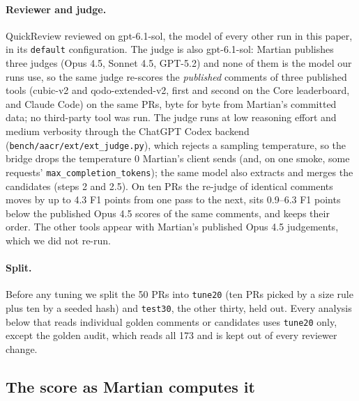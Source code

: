 \documentclass[11pt,a4paper]{article}
\newcommand{\qcr}{QuickReview}
\newcommand{\code}[1]{\texttt{#1}}
\begin{document}
\paragraph{Reviewer and judge.} \qcr{} reviewed on gpt-6.1-sol, the model of
every other run in this paper, in its \code{default} configuration. The
judge is also gpt-6.1-sol: Martian publishes three judges (Opus 4.5,
Sonnet 4.5, GPT-5.2) and none of them is the model our runs use, so the same
judge re-scores the \emph{published} comments of three published tools
(cubic-v2 and qodo-extended-v2, first and second on the Core leaderboard, and
Claude Code) on the same PRs, byte for byte from Martian's committed data; no
third-party tool was run. The judge runs at low reasoning effort and medium
verbosity through the ChatGPT Codex backend (\code{bench/aacr/ext/ext\_judge.py}),
which rejects a sampling temperature, so the bridge drops the temperature 0
Martian's client sends (and, on one smoke, some requests'
\code{max\_completion\_tokens}); the same model also extracts and merges the
candidates (steps 2 and 2.5). On ten PRs the re-judge of identical comments moves
by up to 4.3 F1 points from one pass to the next, sits 0.9--6.3 F1 points
below the published Opus 4.5 scores of the same comments, and keeps their
order. The other tools appear with Martian's published Opus 4.5
judgements, which we did not re-run.

\paragraph{Split.} Before any tuning we split the 50 PRs into
\code{tune20} (ten PRs picked by a size rule plus ten by a seeded hash) and
\code{test30}, the other thirty, held out. Every analysis below that reads
individual golden comments or candidates uses \code{tune20} only, except the
golden audit, which reads all 173 and is kept out of every reviewer change.

\subsection{The score as Martian computes it}
\end{document}
